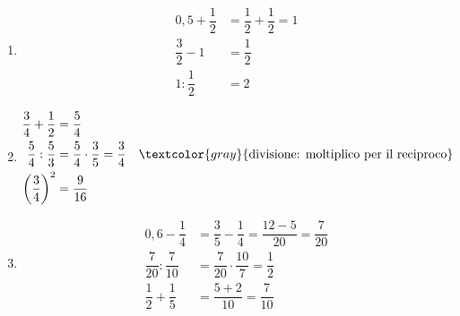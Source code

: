 \begin{question}[ID=2.2, subtitle={Calcolo di espressioni frazionarie — serie 2}, tags={espressioni, frazionarie}, difficulty=media]
\begin{explanation}
\begin{enumerate}
\[\begin{aligned}
    \dfrac56-\dfrac56 &= 0 && \textcolor{gray}{\text{quadra}}\\
    0^2+\dfrac14 &= \dfrac14
    \end{aligned}\]
    \item \[\begin{aligned}
    0{,}5+\dfrac12 &= \dfrac12+\dfrac12=1\\
    \dfrac32-1 &= \dfrac12\\
    1:\dfrac12 &= 2
    \end{aligned}\]
    \item \[\begin{aligned}
    \dfrac34+\dfrac12 &= \dfrac54\\
    \dfrac54:\dfrac53 &= \dfrac54\cdot\dfrac35=\dfrac34 && \textcolor{gray}{\text{divisione: moltiplico per il reciproco}}\\
    \left(\dfrac34\right)^2 &= \dfrac9{16}
    \end{aligned}\]
    \item \[\begin{aligned}
    0{,}6-\dfrac14 &= \dfrac35-\dfrac14=\dfrac{12-5}{20}=\dfrac{7}{20}\\
    \dfrac7{20}:\dfrac7{10} &= \dfrac7{20}\cdot\dfrac{10}7=\dfrac12\\
    \dfrac12+\dfrac15 &= \dfrac{5+2}{10}=\dfrac{7}{10}
    \end{aligned}\]
\end{enumerate}
\end{explanation}
\end{question}





